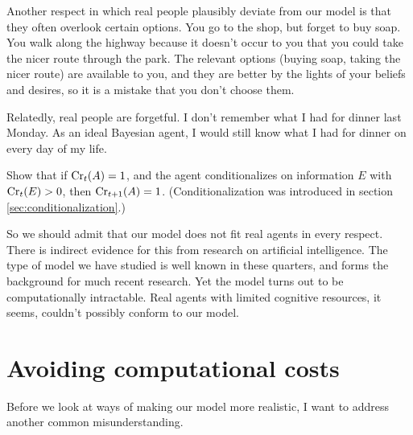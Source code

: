 Another respect in which real people plausibly deviate from our model
is that they often overlook certain options. You go to the shop, but
forget to buy soap. You walk along the highway because it doesn't
occur to you that you could take the nicer route through the park. The
relevant options (buying soap, taking the nicer route) are available
to you, and they are better by the lights of your beliefs and desires,
so it is a mistake that you don't choose them.

Relatedly, real people are forgetful. I don't remember what I had for
dinner last Monday. As an ideal Bayesian agent, I would still know
what I had for dinner on every day of my life.

\begin{exercise2}
  Show that if $\text{Cr}_t(A) = 1$, and the agent conditionalizes on
  information $E$ with $\text{Cr}_t(E) > 0$, then $\text{Cr}_{t+1}(A) =
  1$. (Conditionalization was introduced in
  section \ref{sec:conditionalization}.) 
\end{exercise2}


So we should admit that our model does not fit real agents in every
respect. There is indirect evidence for this from research on
artificial intelligence. The type of model we have studied is well
known in these quarters, and forms the background for much recent
research.%
Yet the model turns out to be computationally intractable. Real agents
with limited cognitive resources, it seems, couldn't possibly conform
to our model.


\section{Avoiding computational costs}

Before we look at ways of making our model more realistic, I want to
address another common misunderstanding.

